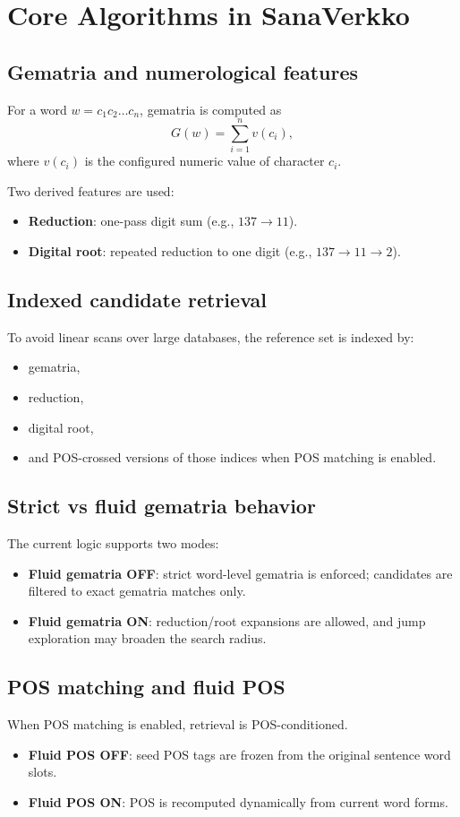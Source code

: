 \documentclass[11pt,a4paper]{report}
\begin{document}
\chapter{Core Algorithms in SanaVerkko}
\section{Gematria and numerological features}
For a word $w = c_1 c_2 \dots c_n$, gematria is computed as
\[
G(w)=\sum_{i=1}^{n} v(c_i),
\]
where $v(c_i)$ is the configured numeric value of character $c_i$.

Two derived features are used:
\begin{itemize}
  \item \textbf{Reduction}: one-pass digit sum (e.g., $137 \rightarrow 11$).
  \item \textbf{Digital root}: repeated reduction to one digit (e.g., $137 \rightarrow 11 \rightarrow 2$).
\end{itemize}

\section{Indexed candidate retrieval}
To avoid linear scans over large databases, the reference set is indexed by:
\begin{itemize}
  \item gematria,
  \item reduction,
  \item digital root,
  \item and POS-crossed versions of those indices when POS matching is enabled.
\end{itemize}

\section{Strict vs fluid gematria behavior}
The current logic supports two modes:
\begin{itemize}
  \item \textbf{Fluid gematria OFF}: strict word-level gematria is enforced; candidates are filtered to exact gematria matches only.
  \item \textbf{Fluid gematria ON}: reduction/root expansions are allowed, and jump exploration may broaden the search radius.
\end{itemize}

\section{POS matching and fluid POS}
When POS matching is enabled, retrieval is POS-conditioned.
\begin{itemize}
  \item \textbf{Fluid POS OFF}: seed POS tags are frozen from the original sentence word slots.
  \item \textbf{Fluid POS ON}: POS is recomputed dynamically from current word forms.
\end{itemize}
\end{document}

